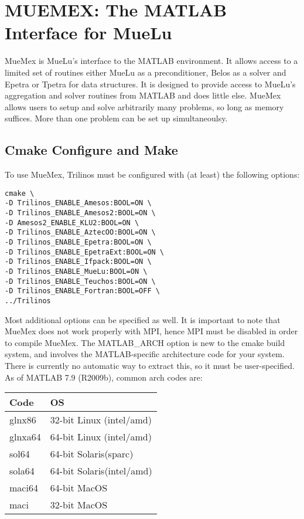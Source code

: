 \section{MUEMEX: The MATLAB Interface for MueLu} \label{sec:muemex}
MueMex is MueLu's interface to the MATLAB environment. It allows access
to a limited set of routines either MueLu as a preconditioner,
Belos as a solver and Epetra or Tpetra for data structures.
It is designed to provide access to MueLu's aggregation and
solver routines from MATLAB and does little else. MueMex allows users to
setup and solve arbitrarily many problems, so long as memory suffices.
More than one problem can be set up simultaneoulsy.

\subsection{Cmake Configure and Make}\label{sec:muemex:cmake}
To use MueMex, Trilinos must be configured with (at least) the
following options:

\begin{verbatim}
cmake \
-D Trilinos_ENABLE_Amesos:BOOL=ON \
-D Trilinos_ENABLE_Amesos2:BOOL=ON \
-D Amesos2_ENABLE_KLU2:BOOL=ON \
-D Trilinos_ENABLE_AztecOO:BOOL=ON \
-D Trilinos_ENABLE_Epetra:BOOL=ON \
-D Trilinos_ENABLE_EpetraExt:BOOL=ON \
-D Trilinos_ENABLE_Ifpack:BOOL=ON \
-D Trilinos_ENABLE_MueLu:BOOL=ON \
-D Trilinos_ENABLE_Teuchos:BOOL=ON \
-D Trilinos_ENABLE_Fortran:BOOL=OFF \
../Trilinos
\end{verbatim}

Most additional options can be specified as well.  It is important to
note that MueMex does not work properly with MPI, hence MPI must be
disabled in order to compile MueMex.  The MATLAB\_ARCH option is new to
the cmake build system, and involves the MATLAB-specific architecture
code for your system.  There is currently no automatic way to extract
this, so it must be user-specified.  As of MATLAB 7.9 (R2009b), common
arch codes are:
\begin{center}
\begin{tabular}{l|l}
Code& OS\\
\hline
glnx86& 32-bit Linux (intel/amd)\\
glnxa64& 64-bit Linux (intel/amd)\\
sol64& 64-bit Solaris(sparc)\\
sola64& 64-bit Solaris(intel/amd)\\
maci64& 64-bit MacOS\\
maci& 32-bit MacOS\\
\end{tabular}
\end{center}


